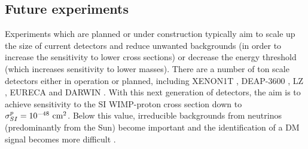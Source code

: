 \subsection{Future experiments}

Experiments which are planned or under construction typically aim to scale up the size of current detectors and reduce unwanted backgrounds (in order to increase the sensitivity to lower cross sections) or decrease the energy threshold (which increases sensitivity to lower masses). There are a number of ton scale detectors either in operation or planned, including XENON1T \cite{Aprile:2012a}, DEAP-3600 \cite{Gorel:2014}, LZ \cite{Malling:2011}, EURECA \cite{Kraus:2007,Roth:2009} and DARWIN \cite{Baudis:2012}. With this next generation of detectors, the aim is to achieve sensitivity to the SI WIMP-proton cross section down to $\sigma_{SI}^p = 10^{-48} \textrm{ cm}^2$. Below this value, irreducible backgrounds from neutrinos (predominantly from the Sun) become important and the identification of a DM signal becomes more difficult \cite{Monroe:2007,Billard:2014}.


